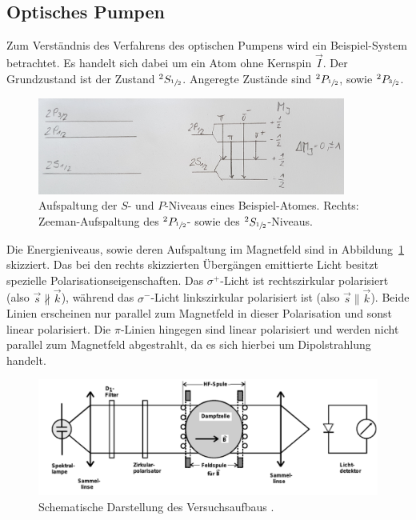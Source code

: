 \subsection{Optisches Pumpen}
%
Zum Verständnis des Verfahrens des optischen Pumpens wird ein Beispiel-System
betrachtet. Es handelt sich dabei um ein Atom ohne Kernspin $\vec{I}$. Der
Grundzustand ist der Zustand $^2S_{\sfrac{1}{2}}$. Angeregte Zustände sind
$^2P_{\sfrac{1}{2}}$, sowie $^2P_{\sfrac{3}{2}}$.
%
\begin{figure}[htb]
  \centering
  \includegraphics[width=0.9\textwidth]{figures/Beispiel.jpg}
  \caption{Aufspaltung der $S$- und $P$-Niveaus eines Beispiel-Atomes. Rechts: Zeeman-Aufspaltung des $^2P_{\sfrac{1}{2}}$- sowie des $^2S_{\sfrac{1}{2}}$-Niveaus.}
  \label{fig:beispiel}
\end{figure}
%
Die Energieniveaus, sowie deren Aufspaltung im Magnetfeld sind in
Abbildung~\ref{fig:beispiel} skizziert. Das bei den rechts skizzierten
Übergängen emittierte Licht besitzt spezielle Polarisationseigenschaften. Das
$\sigma^+$-Licht ist rechtszirkular polarisiert (also
$\vec{s}\nparallel\vec{k}$), während das $\sigma^-$-Licht linkszirkular
polarisiert ist (also $\vec{s}\parallel\vec{k}$). Beide Linien erscheinen nur
parallel zum Magnetfeld in dieser Polarisation und sonst linear polarisiert.
Die $\pi$-Linien hingegen sind linear polarisiert und werden nicht parallel zum
Magnetfeld abgestrahlt, da es sich hierbei um Dipolstrahlung handelt.\\
%
\begin{figure}[htb]
  \centering
  \includegraphics[width=\textwidth]{figures/Versuchsaufbau.pdf}
  \caption{Schematische Darstellung des Versuchsaufbaus \cite{V21}.}
  \label{fig:aufbau}
\end{figure}
